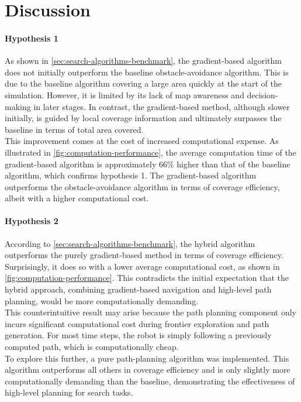 \section{Discussion}
\paragraph{Hypothesis 1}
As shown in \cref{sec:search-algorithms-benchmark}, the gradient-based algorithm does not initially outperform the baseline obstacle-avoidance algorithm. This is due to the baseline algorithm covering a large area quickly at the start of the simulation. However, it is limited by its lack of map awareness and decision-making in later stages. In contrast, the gradient-based method, although slower initially, is guided by local coverage information and ultimately surpasses the baseline in terms of total area covered.\\

This improvement comes at the cost of increased computational expense. As illustrated in \cref{fig:computation-performance}, the average computation time of the gradient-based algorithm is approximately 66\% higher than that of the baseline algorithm, which confirms hypothesis 1. The gradient-based algorithm outperforms the obstacle-avoidance algorithm in terms of coverage efficiency, albeit with a higher computational cost.

\paragraph{Hypothesis 2}
According to \cref{sec:search-algorithms-benchmark}, the hybrid algorithm outperforms the purely gradient-based method in terms of coverage efficiency. Surprisingly, it does so with a lower average computational cost, as shown in \cref{fig:computation-performance}. This contradicts the initial expectation that the hybrid approach, combining gradient-based navigation and high-level path planning, would be more computationally demanding. \\

This counterintuitive result may arise because the path planning component only incurs significant computational cost during frontier exploration and path generation. For most time steps, the robot is simply following a previously computed path, which is computationally cheap. \\

To explore this further, a pure path-planning algorithm was implemented. This algorithm outperforms all others in coverage efficiency and is only slightly more computationally demanding than the baseline, demonstrating the effectiveness of high-level planning for search tasks. \\

